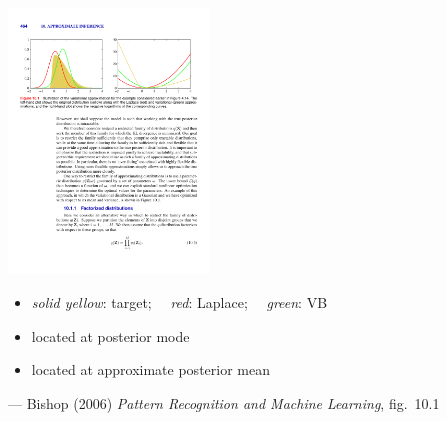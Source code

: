 \documentclass[10pt]{report}
\begin{document}
%
\vspace*{-6pt}
\begin{center}
\includegraphics[width=0.4\textwidth]{img/bishop-fig-10-1.pdf}
\end{center}
\vspace*{-10pt}
\begin{itemize}
\item {\slshape solid yellow}: target; \ \ {\slshape red}: Laplace; \ \
  {\slshape green}: VB
\item {} located at posterior mode
\item {} located at approximate posterior mean
\end{itemize}
\vfill \hfill
{\footnotesize  --- Bishop (2006) {\slshape Pattern Recognition and Machine Learning}, fig.~10.1}
\end{document}
